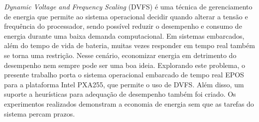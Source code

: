 \documentclass[a4paper]{abnt}
\begin{document}
    \begin{resumo}
    
        \emph{Dynamic Voltage and Frequency Scaling} (DVFS) é uma técnica de gerenciamento de energia que permite ao sistema operacional decidir quando alterar a tensão e frequência do processador, sendo possível reduzir o desempenho e consumo de energia durante uma baixa demanda computacional. Em sistemas embarcados, além do tempo de vida de bateria, muitas vezes responder em tempo real também se torna uma restrição. Nesse cenário, economizar energia em detrimento do desempenho nem sempre pode ser uma boa ideia. Explorando este problema, o presente trabalho porta o sistema operacional embarcado de tempo real EPOS para a plataforma Intel PXA255, que permite o uso de DVFS. Além disso, um suporte a heurísticas para adequação de desempenho também foi criado. Os experimentos realizados demonstram a economia de energia sem que as tarefas do sistema percam prazos.

        
        
    \end{resumo}

    \sumario
    \listoffigures
    \listoftables
    \listofalgorithms

    \acresetall

    
    
    
    
    

    

    
\end{document}
